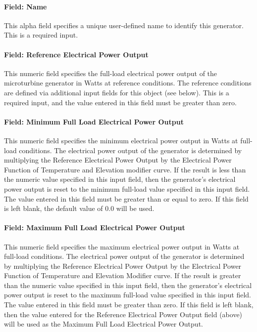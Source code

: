 \paragraph{Field: Name}\label{field-name-10-003}

This alpha field specifies a unique user-defined name to identify this generator. This is a required input.

\paragraph{Field: Reference Electrical Power Output}\label{field-reference-electrical-power-output}

This numeric field specifies the full-load electrical power output of the microturbine generator in Watts at reference conditions. The reference conditions are defined via additional input fields for this object (see below). This is a required input, and the value entered in this field must be greater than zero.

\paragraph{Field: Minimum Full Load Electrical Power Output}\label{field-minimum-full-load-electrical-power-output}

This numeric field specifies the minimum electrical power output in Watts at full-load conditions. The electrical power output of the generator is determined by multiplying the Reference Electrical Power Output by the Electrical Power Function of Temperature and Elevation modifier curve. If the result is less than the numeric value specified in this input field, then the generator's electrical power output is reset to the minimum full-load value specified in this input field. The value entered in this field must be greater than or equal to zero. If this field is left blank, the default value of 0.0 will be used.

\paragraph{Field: Maximum Full Load Electrical Power Output}\label{field-maximum-full-load-electrical-power-output}

This numeric field specifies the maximum electrical power output in Watts at full-load conditions. The electrical power output of the generator is determined by multiplying the Reference Electrical Power Output by the Electrical Power Function of Temperature and Elevation Modifier curve. If the result is greater than the numeric value specified in this input field, then the generator's electrical power output is reset to the maximum full-load value specified in this input field. The value entered in this field must be greater than zero. If this field is left blank, then the value entered for the Reference Electrical Power Output field (above) will be used as the Maximum Full Load Electrical Power Output.


